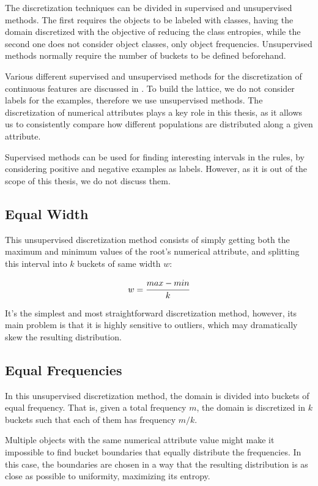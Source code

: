 The discretization techniques can be divided in supervised and unsupervised methods. The first requires the objects to
be labeled with classes, having the domain discretized with the objective of reducing the class entropies, while the
second one does not consider object classes, only object frequencies. Unsupervised methods normally require the number
of buckets to be defined beforehand.

Various different supervised and unsupervised methods for the discretization of continuous features are discussed in
\citet{Dougherty95supervisedand}. To build the lattice, we do not consider labels for the examples, therefore we use
unsupervised methods. The discretization of numerical attributes plays a key role in this thesis, as it allows us
to consistently compare how different populations are distributed along a given attribute.

Supervised methods can be used for finding interesting intervals in the rules, by considering positive and negative
examples as labels. However, as it is out of the scope of this thesis, we do not discuss them.

\subsection{Equal Width}
This unsupervised discretization method consists of simply getting both the maximum and minimum values of the root's
numerical attribute, and splitting this interval into $k$ buckets of same width $w$:

\begin{equation}
 w=\cfrac{max-min}{k}
\end{equation}

It's the simplest and most straightforward discretization method, however, its main problem is that it is highly
sensitive to outliers, which may dramatically skew the resulting distribution.

\subsection{Equal Frequencies}

In this unsupervised discretization method, the domain is divided into buckets of equal frequency. That is,
given a total frequency $m$, the domain is discretized in $k$ buckets such that each of them has frequency $m/k$. 

Multiple objects with the same numerical attribute value might make it impossible to find bucket boundaries that equally
distribute the frequencies. In this case, the boundaries are chosen in a way that the resulting distribution is as close
as possible to uniformity, maximizing its entropy.

